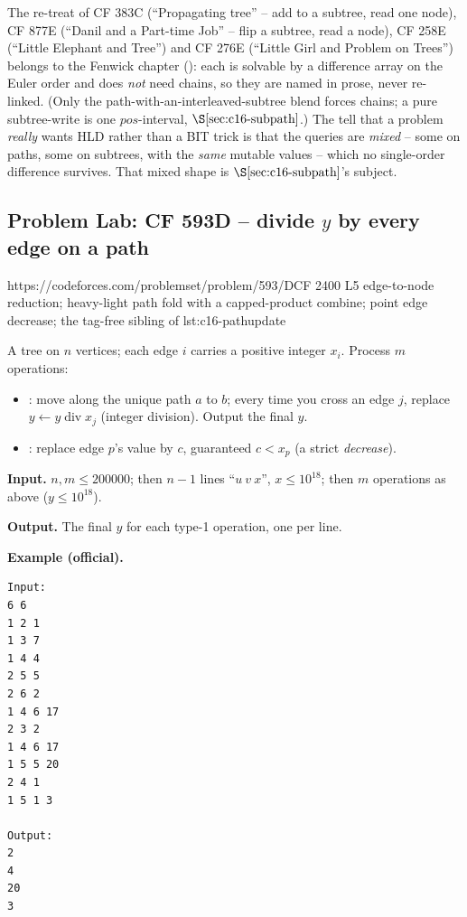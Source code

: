 \begin{observation}
The re-treat of CF 383C (``Propagating tree'' -- add to a subtree, read one node), CF 877E (``Danil and a Part-time Job'' -- flip a subtree, read a node), CF 258E (``Little Elephant and Tree'') and CF 276E (``Little Girl and Problem on Trees'') belongs to the Fenwick chapter (): each is solvable by a difference array on the Euler order and does \emph{not} need chains, so they are named in prose, never re-linked.  (Only the path-with-an-interleaved-subtree blend forces chains; a pure subtree-write is one \(\mathit{pos}\)-interval, \(\secref{c16-subpath}\).)  The tell that a problem \emph{really} wants HLD rather than a BIT trick is that the queries are \emph{mixed} -- some on paths, some on subtrees, with the \emph{same} mutable values -- which no single-order difference survives.  That mixed shape is \(\secref{c16-subpath}\)'s subject.
\end{observation}

\subsection{Problem Lab: CF 593D -- divide \(y\) by every edge on a path}

  {https://codeforces.com/problemset/problem/593/D}{CF 2400 L5}
  {edge-to-node reduction; heavy-light path fold with a capped-product combine; point edge decrease; the tag-free sibling of lst:c16-pathupdate}

\begin{problemstatement}
A tree on \(n\) vertices; each edge \(i\) carries a positive integer \(x_i\). Process \(m\) operations:
\begin{itemize}[nosep]
  \item {}: move along the unique path \(a\) to \(b\); every time you cross an edge \(j\), replace \(y \leftarrow y \operatorname{div} x_j\) (integer division). Output the final \(y\).
  \item {}: replace edge \(p\)'s value by \(c\), guaranteed \(c < x_p\) (a strict \emph{decrease}).
\end{itemize}

\textbf{Input.} \(n,m\le 200000\); then \(n-1\) lines ``\(u\ v\ x\)'', \(x\le 10^{18}\); then \(m\) operations as above (\(y\le 10^{18}\)).

\textbf{Output.} The final \(y\) for each type-1 operation, one per line.

\textbf{Example (official).}
\begin{verbatim}
Input:
6 6
1 2 1
1 3 7
1 4 4
2 5 5
2 6 2
1 4 6 17
2 3 2
1 4 6 17
1 5 5 20
2 4 1
1 5 1 3

Output:
2
4
20
3
\end{verbatim}
\end{problemstatement}


